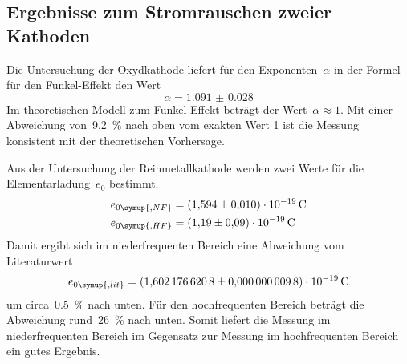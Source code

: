 \subsection{Ergebnisse zum Stromrauschen zweier Kathoden}

Die Untersuchung der Oxydkathode liefert für den Exponenten~$\alpha$ in der
Formel für den Funkel-Effekt den Wert
%
\begin{equation}
  \alpha=\num{1.091(28)}
\end{equation}
%
Im theoretischen Modell zum Funkel-Effekt beträgt der Wert~$\alpha\approx 1$.
Mit einer Abweichung von~\SI{9.2}{\percent} nach oben vom exakten Wert 1 ist die
Messung konsistent mit der theoretischen Vorhersage.

Aus der Untersuchung der Reinmetallkathode werden zwei Werte für die
Elementarladung~$e_0$ bestimmt.
%
\begin{align}
  e_{0\symup{, NF}}&=\SI{1.594(10)e-19}{\coulomb} \\
  e_{0\symup{, HF}}&=\SI{1.19(9)e-19}{\coulomb}
\end{align}
%
Damit ergibt sich im niederfrequenten Bereich eine Abweichung vom
Literaturwert~\cite{CODATA}
%
\begin{equation}
  e_{0\symup{, lit}}=\SI{1.6021766208(98)e-19}{\coulomb}
\end{equation}
%
um circa~\SI{0.5}{\percent} nach unten. Für den hochfrequenten Bereich beträgt
die Abweichung rund~\SI{26}{\percent} nach unten. Somit liefert die Messung im
niederfrequenten Bereich im Gegensatz zur Messung im hochfrequenten Bereich ein
gutes Ergebnis.
%
\nocite{V57}
